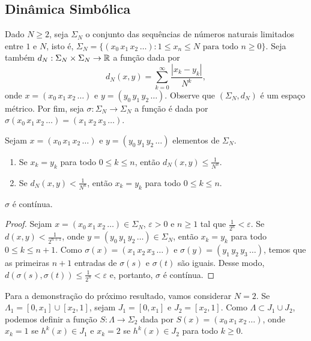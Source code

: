 \subsection{Dinâmica Simbólica}

Dado $N \geq 2$, seja $\Sigma_N$ o conjunto das sequências de números naturais limitados entre $1$ e $N$, isto é, $\Sigma_N = \lbrace (x_0 \, x_1 \, x_2 \, \dots) : 1 \leq x_n \leq N  \text{ para todo } n \geq 0 \rbrace$.
Seja também $d_N : \Sigma_N \times \Sigma_N \to \mathbb{R}$ a função dada por
$$d_N(x, y) = \sum_{k=0}^\infty \frac{|x_k - y_k|}{N^k},$$
onde $x = (x_0 \, x_1 \, x_2 \, \dots)$ e $y = (y_0 \, y_1 \, y_2 \, \dots)$.
Observe que $(\Sigma_N, d_N)$ é um espaço métrico.
Por fim, seja $\sigma: \Sigma_N \to \Sigma_N$ a função é dada por $\sigma(x_0 \, x_1 \, x_2 \, \dots) = (x_1 \, x_2 \, x_3 \, \dots)$.

\begin{proposition}
Sejam $x = (x_0 \, x_1 \, x_2 \, \dots)$ e $y = (y_0 \, y_1 \, y_2 \, \dots)$ elementos de $\Sigma_N$.
\begin{enumerate}
\item Se $x_k = y_k$ para todo $0 \leq k \leq n$, então $d_N(x, y) \leq \frac{1}{N^n}$.
\item Se $d_N(x, y) < \frac{1}{N^n}$, então $x_k = y_k$ para todo $0 \leq k \leq n$.
\end{enumerate}
\end{proposition}

\begin{proposition}
$\sigma$ é contínua.
\end{proposition}

\begin{proof}
Sejam $x = (x_0 \, x_1 \, x_2 \, \dots) \in \Sigma_N$, $\varepsilon > 0$ e $n \geq 1$ tal que $\frac{1}{2^n} < \varepsilon$.
Se $d(x, y) < \frac{1}{2^{n+1}}$, onde $y = (y_0 \, y_1 \, y_2 \, \dots) \in \Sigma_N$, então $x_k = y_k$ para todo $0 \leq k \leq n+1$.
Como $\sigma(x) = (x_1 \, x_2 \, x_3  \, \dots)$ e $\sigma(y) = (y_1 \, y_2 \, y_3 \, \dots)$, temos que as primeiras $n+1$ entradas de $\sigma(s)$ e $\sigma(t)$ são iguais. Desse modo,  $d(\sigma(s), \sigma(t)) \leq \frac{1}{2^n} < \varepsilon$ e, portanto, $\sigma$ é contínua.
\end{proof}

Para a demonstração do próximo resultado, vamos considerar $N = 2$.
Se $\Lambda_1 = [0, x_1] \cup [x_2, 1]$, sejam $J_1 = [0, x_1]$ e $J_2 = [x_2, 1]$.
Como $\Lambda \subset J_1 \cup J_2$, podemos definir a função $S: \Lambda \to \Sigma_2$ dada por $S(x) = (x_0 \, x_1 \, x_2 \, \dots)$, onde $x_k = 1$ se $h^k(x) \in J_1$ e $x_k = 2$ se $h^k(x) \in J_2$ para todo $k \geq 0$.


